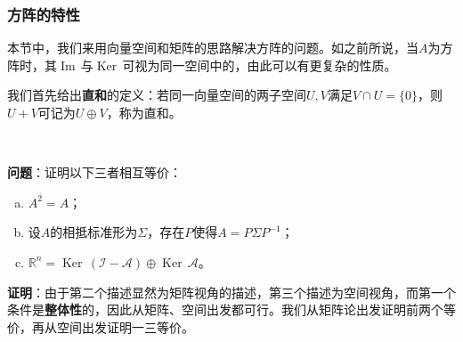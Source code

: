 \documentclass[a4paper,UTF8,fontset=windows]{ctexart}
\DeclareMathOperator{\im}{Im\,}
\DeclareMathOperator{\Ker}{Ker\,}
\newcommand*{\ma}{\mathcal{A}}
\newcommand*{\mi}{\mathcal{I}}
\begin{document}
\subsubsection{方阵的特性}
本节中，我们来用向量空间和矩阵的思路解决方阵的问题。如之前所说，当$A$为方阵时，其$\im$与$\Ker$可视为同一空间中的，由此可以有更复杂的性质。

我们首先给出\textbf{直和}的定义：若同一向量空间的两子空间$U,V$满足$V\cap U=\{0\}$，则$U+V$可记为$U\oplus V$，称为直和。

\

\textbf{问题}：证明以下三者相互等价：
\begin{enumerate}[a.]
    \item $A^2=A$；
    \item 设$A$的相抵标准形为$\Sigma$，存在$P$使得$A=P\Sigma P^{-1}$；
    \item $\mathbb{R}^n=\Ker(\mi-\ma)\oplus\Ker\ma$。
\end{enumerate}
\textbf{证明}：由于第二个描述显然为矩阵视角的描述，第三个描述为空间视角，而第一个条件是\textbf{整体性}的，因此从矩阵、空间出发都可行。我们从矩阵论出发证明前两个等价，再从空间出发证明一三等价。
\end{document}
